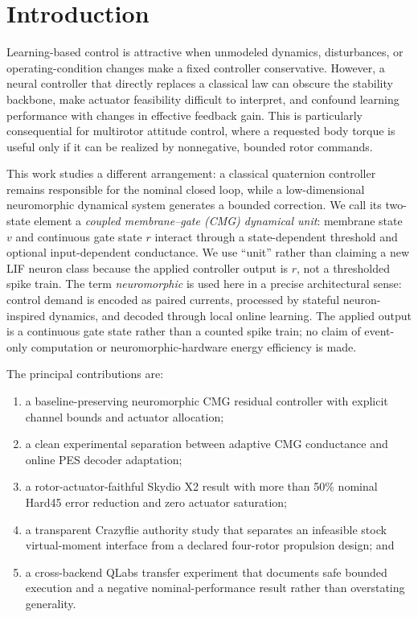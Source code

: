 \documentclass[10pt,twocolumn]{article}
\begin{document}
\section{Introduction}

Learning-based control is attractive when unmodeled dynamics, disturbances, or
operating-condition changes make a fixed controller conservative. However, a
neural controller that directly replaces a classical law can obscure the
stability backbone, make actuator feasibility difficult to interpret, and
confound learning performance with changes in effective feedback gain. This is
particularly consequential for multirotor attitude control, where a requested
body torque is useful only if it can be realized by nonnegative, bounded rotor
commands.

This work studies a different arrangement: a classical quaternion controller
remains responsible for the nominal closed loop, while a low-dimensional
neuromorphic dynamical system generates a bounded correction. We call its
two-state element a \emph{coupled membrane--gate (CMG) dynamical unit}: membrane
state $v$ and continuous gate state $r$ interact through a state-dependent
threshold and optional input-dependent conductance. We use ``unit'' rather than
claiming a new LIF neuron class because the applied controller output is $r$, not
a thresholded spike train. The
term \emph{neuromorphic} is used here in a precise architectural sense: control
demand is encoded as paired currents, processed by stateful neuron-inspired
dynamics, and decoded through local online learning. The applied output is a
continuous gate state rather than a counted spike train; no claim of event-only
computation or neuromorphic-hardware energy efficiency is made.

The principal contributions are:
\begin{enumerate}
    \item a baseline-preserving neuromorphic CMG residual controller with
    explicit channel bounds and actuator allocation;
    \item a clean experimental separation between adaptive CMG conductance
    and online PES decoder adaptation;
    \item a rotor-actuator-faithful Skydio X2 result with more than 50\% nominal
    Hard45 error reduction and zero actuator saturation;
    \item a transparent Crazyflie authority study that separates an infeasible
    stock virtual-moment interface from a declared four-rotor propulsion design;
    and
    \item a cross-backend QLabs transfer experiment that documents safe bounded
    execution and a negative nominal-performance result rather than overstating
    generality.
\end{enumerate}
\end{document}
